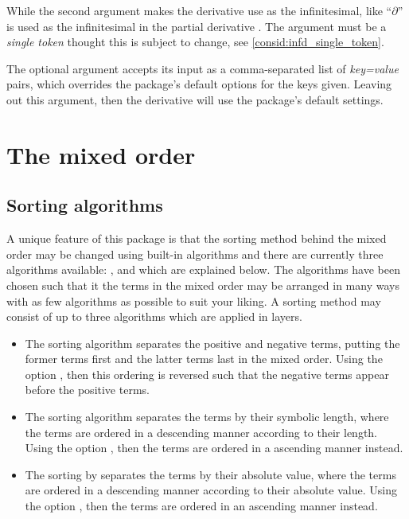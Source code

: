 \documentclass[final,british,10pt]{scrartcl}
\theoremstyle{remark}
\begin{document}
While the second argument makes the derivative  use  as the infinitesimal, like \enquote{$\partial$} is used as the infinitesimal in the partial derivative \macro{\pdv}. The argument must be a \emph{single token} thought this is subject to change, see \cref{consid:infd_single_token}.

The optional argument accepts its input as a comma-separated list of \emph{key=value} pairs, which overrides the package's default options for the keys given. Leaving out this argument, then the derivative will use the package's default settings.


\clearpage
\section{The mixed order} \label{ssec:overall_order}

\subsection{Sorting algorithms} \label{ssec:sort-method}
A unique feature of this package is that the sorting method behind the mixed order may be changed using built-in algorithms and there are currently three algorithms available: ,  and  which are explained below. The algorithms have been chosen such that it the terms in the mixed order may be arranged in many ways with as few algorithms as possible to suit your liking. A sorting method may consist of up to three algorithms which are applied in layers.

\begin{itemize}
	\item The sorting algorithm  separates the positive and negative terms, putting the former terms first and the latter terms last in the mixed order. Using the option , then this ordering is reversed such that the negative terms appear before the positive terms.
	\item The sorting algorithm  separates the terms by their symbolic length, where the terms are ordered in a descending manner according to their length. Using the option , then the terms are ordered in a ascending manner instead.
	\item The sorting by  separates the terms by their absolute value, where the terms are ordered in a descending manner according to their absolute value. Using the option , then the terms are ordered in an ascending manner instead.
\end{itemize}
\end{document}
